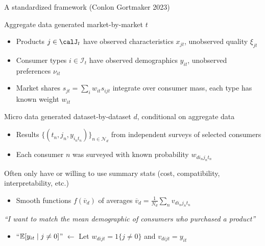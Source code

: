 \begin{frame}[label=framework]{A standardized framework (Conlon Gortmaker 2023)}
    \begin{wideitemize}
        
        \item Aggregate data generated market-by-market $t$
        \begin{itemize}
            \item \alert{Products} $j \in \calJ_t$ have observed characteristics $x_{jt}$, unobserved quality $\xi_{jt}$
            \item \alert{Consumer types} $i \in \mathcal{I}_t$ have observed demographics $y_{it}$, unobserved preferences $\nu_{it}$
            \item \alert{Market shares} $s_{jt} = \sum_i w_{it} s_{ijt}$ integrate over consumer mass, each type has known weight $w_{it}$
        \end{itemize}
        
        \item Micro data generated dataset-by-dataset $d$, conditional on aggregate data
        \begin{itemize}
            \item Results $\{(t_n, j_n, y_{i_nt_n})\}_{n \in \mathcal{N}_d}$ from \alert{independent surveys} of \alert{selected consumers}
            \item Each consumer $n$ was surveyed with known probability $w_{di_nj_nt_n}$
        \end{itemize}
        
        \item Often only have or willing to use \alert{summary stats} (cost, compatibility, interpretability, etc.)
        \begin{itemize}
            \item Smooth functions $f(\overline{v}_d)$ of averages $\overline{v}_d = \frac{1}{N_d} \sum_n v_{di_nj_nt_n}$
        \end{itemize}
        
        \item \textit{``I want to match the mean demographic of consumers who purchased a product''}
        \begin{itemize}
            \item ``$\mathbb{E}[y_{it} \mid j \neq 0]$'' $\leftarrow$ Let $w_{dijt} = 1\{j \neq 0\}$ and $v_{dijt} = y_{it}$
        \end{itemize}
    \end{wideitemize}
\end{frame}



